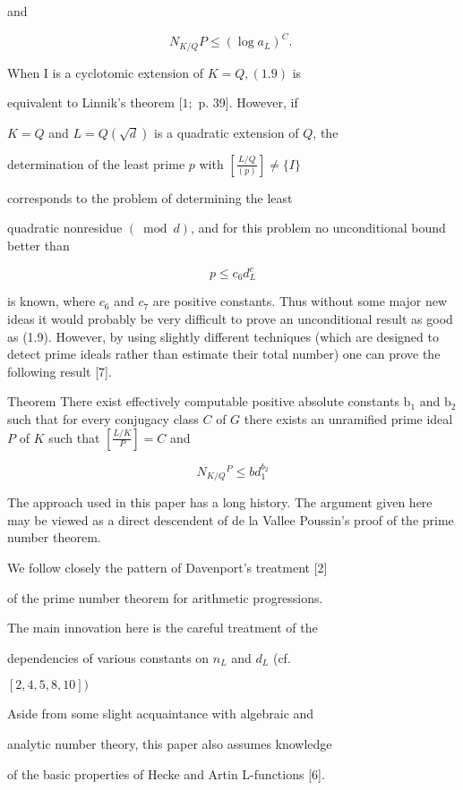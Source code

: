 and

$$
N_{K / Q} P \leqslant\left(\log a_{L}\right)^{C} \text {. }
$$

When I is a cyclotomic extension of $K=Q,(1.9)$ is

equivalent to Linnik's theorem $[1 ;$ p. 39]. However, if

$K=Q$ and $L=Q(\sqrt{d})$ is a quadratic extension of $Q$, the

determination of the least prime $p$ with $\left[\frac{L / Q}{(p)}\right] \neq\{I\}$

corresponds to the problem of determining the least

quadratic nonresidue $(\bmod d)$, and for this problem no unconditional bound better than

$$
p \leqslant c_{6} d_{L}^{c}
$$

is known, where $c_{6}$ and $c_{7}$ are positive constants. Thus without some major new ideas it would probably be very difficult to prove an unconditional result as good as (1.9). However, by using slightly different techniques (which are designed to detect prime ideals rather than estimate their total number) one can prove the following result [7].

Theorem There exist effectively computable positive absolute constants $\mathrm{b}_{1}$ and $\mathrm{b}_{2}$ such that for every conjugacy class $C$ of $G$ there exists an unramified prime ideal $P$ of $K$ such that $\left[\frac{L / K}{P}\right]=C$ and

$$
N_{K / Q}{ }^{P} \leqslant b d_{1}^{b_{2}}
$$

The approach used in this paper has a long history. The argument given here may be viewed as a direct descendent of de la Vallee Poussin's proof of the prime number theorem.

We follow closely the pattern of Davenport's treatment [2]

of the prime number theorem for arithmetic progressions.

The main innovation here is the careful treatment of the

dependencies of various constants on $n_{L}$ and $d_{L}$ (cf.

$[2,4,5,8,10])$

Aside from some slight acquaintance with algebraic and

analytic number theory, this paper also assumes knowledge

of the basic properties of Hecke and Artin L-functions [6].

